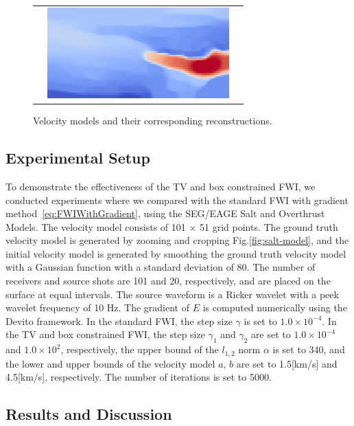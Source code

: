 \begin{figure}[htbp]
\begin{tabular}{m{68mm} m{70mm} m{10mm}}
\begin{minipage}[b]{70mm}
            \caption*{Initial model}
        \end{minipage} &
        \begin{minipage}[b]{70mm}
            \centering
            \includegraphics[width=70mm]{public/pds}
            \caption*{Reconstructed with the constrained FWI}
        \end{minipage} &
    \end{tabular}
    \caption{Velocity models and their corresponding reconstructions.}
    \label{fig:velocity-models}
\end{figure}


\subsection{Experimental Setup}\label{subsec:experimental-setup}

To demonstrate the effectiveness of the TV and box constrained FWI, we conducted experiments where we compared with the standard FWI with gradient method~\eqref{eq:FWIWithGradient}, using the SEG/EAGE Salt and Overthrust Models.
The velocity model consists of 101 $\times$ 51 grid points.
The ground truth velocity model is generated by zooming and cropping Fig.\ref{fig:salt-model}, and the initial velocity model is generated by smoothing the ground truth velocity model with a Gaussian function with a standard deviation of 80.
The number of receivers and source shots are 101 and 20, respectively, and are placed on the surface at equal intervals.
The source waveform is a Ricker wavelet with a peek wavelet frequency of 10 Hz.
The gradient of $E$ is computed numerically using the Devito framework\cite{devito}.
In the standard FWI, the step size $\gamma$ is set to $1.0 \times 10^{-4}$.
In the TV and box constrained FWI, the step size $\gamma_1$ and $\gamma_2$ are set to $1.0 \times 10^{-4}$ and $1.0 \times 10^2$, respectively, the upper bound of the $l_{1,2}$ norm $\alpha$ is set to 340, and the lower and upper bounds of the velocity model $a$, $b$ are set to 1.5[km/s] and 4.5[km/s], respectively.
The number of iterations is set to 5000.


\subsection{Results and Discussion}\label{subsec:results-and-discussion}

